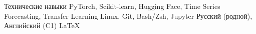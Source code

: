 
\begin{rubric}{Технические навыки}
\entry*[ML/DL]%
	PyTorch, Scikit-learn, Hugging Face, Time Series Forecasting, Transfer Learning
\entry*[Инфраструктура]%
	Linux, Git, Bash/Zsh, Jupyter
\entry*[Языки]%
	Русский (родной), Английский (C1)
\entry*[Доп.]%
	\LaTeX
\end{rubric}
